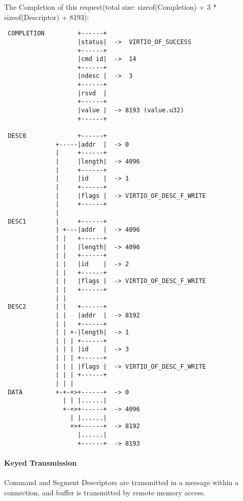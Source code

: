 The Completion of this request(total size: sizeof(Completion) + 3 * sizeof(Descriptor) + 8193):
\begin{lstlisting}
 COMPLETION         +------+
                    |status|  ->  VIRTIO_OF_SUCCESS
                    +------+
                    |cmd id|  ->  14
                    +------+
                    |ndesc |  ->  3
                    +------+
                    |rsvd  |
                    +------+
                    |value |  -> 8193 (value.u32)
                    +------+

 DESC0              +------+
              +-----|addr  |  -> 0
              |     +------+
              |     |length|  -> 4096
              |     +------+
              |     |id    |  -> 1
              |     +------+
              |     |flags |  -> VIRTIO_OF_DESC_F_WRITE
              |     +------+
              |
 DESC1        |     +------+
              | +---|addr  |  -> 4096
              | |   +------+
              | |   |length|  -> 4096
              | |   +------+
              | |   |id    |  -> 2
              | |   +------+
              | |   |flags |  -> VIRTIO_OF_DESC_F_WRITE
              | |   +------+
              | |
 DESC2        | |   +------+
              | |   |addr  |  -> 8192
              | |   +------+
              | | +-|length|  -> 1
              | | | +------+
              | | | |id    |  -> 3
              | | | +------+
              | | | |flags |  -> VIRTIO_OF_DESC_F_WRITE
              | | | +------+
              | | |
 DATA         +-+-+>+------+  -> 0
                | | |......|
                +-+>+------+  -> 4096
                  | |......|
                  +>+------+  -> 8192
                    |......|
                    +------+  -> 8193
\end{lstlisting}

\paragraph{Keyed Transmission}\label{sec:Virtio Transport Options / Virtio Over Fabrics / Transmission Protocol / Commands Definition / Keyed Transmission}
Command and Segment Descriptors are transmitted in a message within a connection, and buffer is transmitted by remote memory access.

